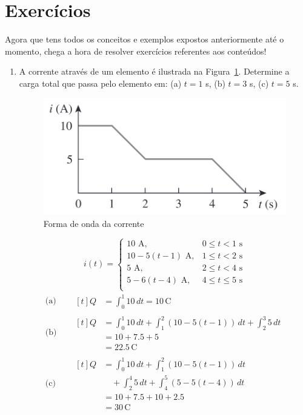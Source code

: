 \section{Exercícios}

Agora que tens todos os conceitos e exemplos expostos anteriormente até o
momento, chega a hora de resolver exercícios referentes aos conteúdos!

\begin{enumerate}
	\item A corrente através de um elemento é ilustrada na Figura~\ref{fig:fig5}.
	      Determine a carga total que passa pelo elemento em: (a) \( t = 1 \) s,
	      (b) \( t = 3 \) s, (c) \( t = 5 \) s.

	      \begin{figure}[H]
		      \centering
		      \includegraphics[height=0.15\textwidth]{./fig/fig5.png}
		      \caption{Forma de onda da corrente}
		      \label{fig:fig5}
	      \end{figure}
	      \[
		      i(t) =
		      \begin{cases}
			      10 \text{ A},            & 0 \leq t < 1 \text{ s}    \\
			      10 - 5(t - 1) \text{ A}, & 1 \leq t < 2 \text{ s}    \\
			      5 \text{ A},             & 2 \leq t < 4 \text{ s}    \\
			      5 - 6(t - 4) \text{ A},  & 4 \leq t \leq 5 \text{ s} \\
		      \end{cases}
	      \]
	      \begin{align*}
		      \text{(a)}\quad &
		      \begin{aligned}[t]
			      Q & = \int_{0}^{1} 10 \,dt = 10 \,\text{C}
		      \end{aligned}
		      \\
		      \text{(b)}\quad &
		      \begin{aligned}[t]
			      Q & = \int_{0}^{1} 10 \,dt + \int_{1}^{2} (10 - 5(t-1)) \,dt + \int_{2}^{3} 5 \,dt \\
			        & = 10 + 7.5 + 5                                                                 \\
			        & = 22.5 \,\text{C}
		      \end{aligned}
		      \\
		      \text{(c)}\quad &
		      \begin{aligned}[t]
			      Q & = \int_{0}^{1} 10 \,dt + \int_{1}^{2} (10 - 5(t-1)) \,dt     \\
			        & \quad + \int_{2}^{4} 5 \,dt + \int_{4}^{5} (5 - 5(t-4)) \,dt \\
			        & = 10 + 7.5 + 10 + 2.5                                        \\
			        & = 30 \,\text{C}
		      \end{aligned}
	      \end{align*}


\end{enumerate}
